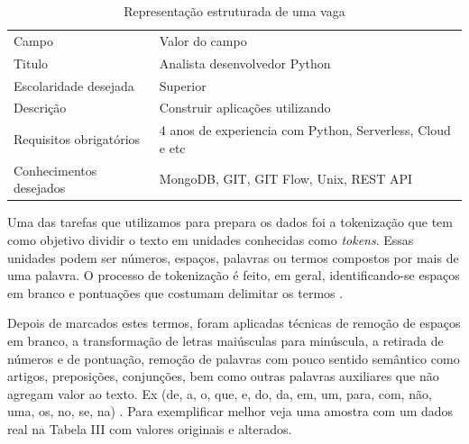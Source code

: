 \documentclass[conference]{IEEEtran}
\begin{document}
\begin{enumerate}
\begin{table}[h]
 \centering
 {\renewcommand\arraystretch{1.25}
\caption{Representação estruturada de uma vaga}
 \begin{tabular}{ l l }
  \cline{1-1}\cline{2-2}  
    \multicolumn{1}{|p{3.0cm}|}{\cellcolor{}Campo \centering } &
    \multicolumn{1}{p{4.217cm}|}{\cellcolor{}Valor do campo \centering }
  \\  
  \cline{1-1}\cline{2-2}  
    \multicolumn{1}{|p{3.0cm}|}{Titulo} &
    \multicolumn{1}{p{4.217cm}|}{ Analista desenvolvedor Python}
  \\  
  \cline{1-1}\cline{2-2}  
    \multicolumn{1}{|p{3.0cm}|}{  Escolaridade desejada } &
    \multicolumn{1}{p{4.217cm}|}{Superior}
  \\  
  \cline{1-1}\cline{2-2}  
    \multicolumn{1}{|p{3.0cm}|}{  Descrição} &
    \multicolumn{1}{p{4.217cm}|}{ Construir aplicações utilizando }
  \\  
  \cline{1-1}\cline{2-2}  
    \multicolumn{1}{|p{3.0cm}|}{  Requisitos obrigatórios } &
    \multicolumn{1}{p{4.217cm}|}{ 4 anos de experiencia com Python, Serverless, Cloud e etc}
  \\  
  \cline{1-1}\cline{2-2}  
    \multicolumn{1}{|p{3.0cm}|}{  Conhecimentos desejados} &
    \multicolumn{1}{p{4.217cm}|}{ MongoDB, GIT, GIT Flow, Unix, REST API}
  \\  
  \hline
 \end{tabular} }
\end{table}


\end{enumerate}


Uma das tarefas que utilizamos para prepara os dados foi a tokenização que tem como objetivo dividir o texto em unidades conhecidas como \textit{tokens}. Essas unidades podem ser números, espaços, palavras ou termos compostos por mais de uma palavra. O processo de tokenização é feito, em geral, identificando-se espaços em branco e pontuações que costumam delimitar os termos \cite{tokenizacao}.

Depois de marcados estes termos, foram aplicadas técnicas de remoção de espaços em branco, a transformação de letras maiúsculas para minúscula, a retirada de números e de pontuação, remoção de palavras com pouco sentido semântico como artigos, preposições, conjunções, bem como outras palavras auxiliares que não agregam valor ao texto. Ex (de, a, o, que, e, do, da, em, um, para, com, não, uma, os, no, se, na) .
Para exemplificar melhor veja uma amostra com um dados real na Tabela III com valores originais e alterados.
\end{document}
